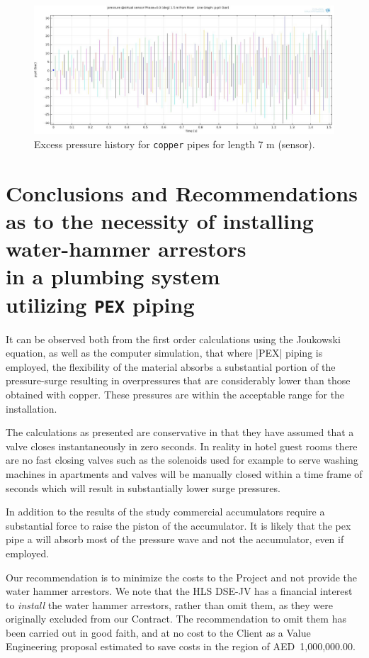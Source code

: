 \begin{figure}[htbp]
\hspace*{-0.1\textwidth}\includegraphics[width=1.2\textwidth]{./water-hammer/copper/CO-7-sensor}
\caption{Excess pressure history for \texttt{copper} pipes for length 7 m (sensor).}
\label{co4}
\end{figure}




\chapter[Conclusions and Recommendations as to the necessity of installing water-hammer arrestors in a plumbing system utilizing \texttt{PEX} piping]{\color{spot!50} Conclusions and Recommendations as to the necessity of installing water-hammer arrestors\\ in a plumbing system\\ utilizing \texttt{PEX} piping}

It can be observed both from the first order calculations using the Joukowski equation, as well as the computer simulation, that where |PEX| piping is employed, the flexibility of the material absorbs a substantial portion of the pressure-surge resulting in overpressures that are considerably lower than those obtained with copper. These pressures are within the acceptable range for the installation.

The calculations as presented are conservative in that they have assumed that a valve closes instantaneously in zero seconds. In reality in hotel guest rooms there are no fast closing valves such as the solenoids used for example to serve washing machines in apartments and valves will be manually closed within a time frame of seconds which will result in substantially lower surge pressures.

In addition to the results of the study commercial accumulators require a substantial force to raise the piston of the accumulator. 
It is likely that  the pex pipe a will absorb most of the pressure wave and not the accumulator, even if employed. 

 Our recommendation is to minimize the costs to the Project and not provide the water hammer arrestors. We note that the HLS DSE-JV has a financial interest to \textit{install} the water hammer arrestors, rather than omit them,  as they were originally excluded from our Contract. The recommendation to omit them has been carried out in good faith, and at no cost to the Client as a Value Engineering proposal estimated to save costs in the region of AED~1,000,000.00.




